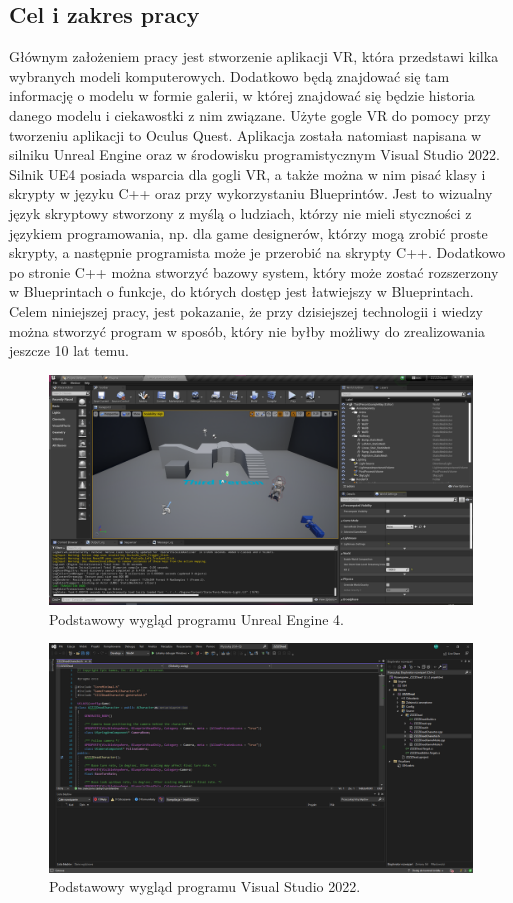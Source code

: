 \documentclass[a4paper,12pt,reqno]{article}
\begin{document}
\subsection{Cel i zakres pracy}

Głównym założeniem pracy jest stworzenie aplikacji VR, która przedstawi kilka wybranych modeli komputerowych. Dodatkowo będą znajdować się tam informację o modelu w formie galerii, w której znajdować się będzie historia danego modelu i ciekawostki z nim związane. Użyte gogle VR do pomocy przy tworzeniu aplikacji to Oculus Quest. Aplikacja została natomiast napisana w silniku Unreal Engine oraz w środowisku programistycznym Visual Studio 2022. Silnik UE4 posiada wsparcia dla gogli VR, a także można w nim pisać klasy i skrypty w języku C++ oraz przy wykorzystaniu Blueprintów. Jest to wizualny język skryptowy stworzony z myślą o ludziach, którzy nie mieli styczności z językiem programowania, np. dla game designerów, którzy mogą zrobić proste skrypty, a następnie programista może je przerobić na skrypty C++. Dodatkowo po stronie C++ można stworzyć bazowy system, który może zostać rozszerzony w Blueprintach o funkcje, do których dostęp jest łatwiejszy w Blueprintach. Celem niniejszej pracy, jest pokazanie, że przy dzisiejszej technologii i wiedzy można stworzyć program w sposób, który nie byłby możliwy do zrealizowania jeszcze 10 lat temu.

\begin{figure}[!ht]%
\centering
\includegraphics[width=0.8\columnwidth]{graphics/UE4View.png}
\caption{Podstawowy wygląd programu Unreal Engine 4.
\label{OpenBrush}}%
%
\qquad
\end{figure}  

\begin{figure}[!ht]%
\centering
\includegraphics[width=0.8\columnwidth]{graphics/VSView.png}
\caption{Podstawowy wygląd programu Visual Studio 2022.
\label{OpenBrush}}%
%
\qquad
\end{figure}  
\end{document}

